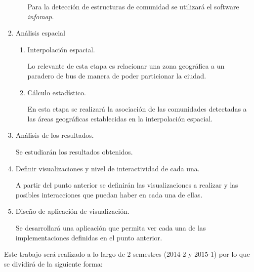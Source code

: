 \documentclass[12pt]{article}
\begin{document}
\begin{enumerate}
\begin{enumerate}
    Para la detección de estructuras de comunidad se utilizará el software \textit{infomap}. 
    \end{enumerate}
    \item Análisis espacial
    \begin{enumerate}
    \item Interpolación espacial.

    Lo relevante de esta etapa es relacionar una zona geográfica a un paradero de bus de manera de poder particionar la ciudad.

    \item Cálculo estadístico.

    En esta etapa se realizará la asociación de las comunidades detectadas a las áreas geográficas establecidas en la interpolación espacial.

    \end{enumerate}
    \item Análisis de los resultados.

    Se estudiarán los resultados obtenidos.

    \item Definir visualizaciones y nivel de interactividad de cada una.

    A partir del punto anterior se definirán las visualizaciones a realizar y las posibles interacciones que puedan haber en cada una de ellas.

    \item Diseño de aplicación de visualización.

    Se desarrollará una aplicación que permita ver cada una de las implementaciones definidas en el punto anterior.

    \end{enumerate}

    Este trabajo será realizado a lo largo de 2 semestres (2014-2 y 2015-1) por lo que se dividirá de la siguiente forma:
\end{document}
